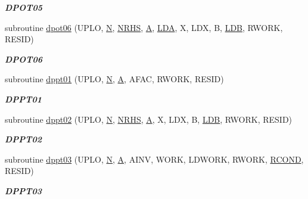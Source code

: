 \begin{DoxyCompactItemize}
\begin{DoxyCompactList}\small\item\em {\bfseries D\+P\+O\+T05} \end{DoxyCompactList}\item 
subroutine \hyperlink{group__double__lin_ga7ee02fd57fbaf3d01efd5c3c4bd04162}{dpot06} (U\+P\+L\+O, \hyperlink{polmisc_8c_a0240ac851181b84ac374872dc5434ee4}{N}, \hyperlink{example__user_8c_aa0138da002ce2a90360df2f521eb3198}{N\+R\+H\+S}, \hyperlink{classA}{A}, \hyperlink{example__user_8c_ae946da542ce0db94dced19b2ecefd1aa}{L\+D\+A}, X, L\+D\+X, B, \hyperlink{example__user_8c_a50e90a7104df172b5a89a06c47fcca04}{L\+D\+B}, R\+W\+O\+R\+K, R\+E\+S\+I\+D)
\begin{DoxyCompactList}\small\item\em {\bfseries D\+P\+O\+T06} \end{DoxyCompactList}\item 
subroutine \hyperlink{group__double__lin_ga5502a5326400044da75e1d0cd2739420}{dppt01} (U\+P\+L\+O, \hyperlink{polmisc_8c_a0240ac851181b84ac374872dc5434ee4}{N}, \hyperlink{classA}{A}, A\+F\+A\+C, R\+W\+O\+R\+K, R\+E\+S\+I\+D)
\begin{DoxyCompactList}\small\item\em {\bfseries D\+P\+P\+T01} \end{DoxyCompactList}\item 
subroutine \hyperlink{group__double__lin_ga34a38ca3e7e4c5fc00c39a32af0d576f}{dppt02} (U\+P\+L\+O, \hyperlink{polmisc_8c_a0240ac851181b84ac374872dc5434ee4}{N}, \hyperlink{example__user_8c_aa0138da002ce2a90360df2f521eb3198}{N\+R\+H\+S}, \hyperlink{classA}{A}, X, L\+D\+X, B, \hyperlink{example__user_8c_a50e90a7104df172b5a89a06c47fcca04}{L\+D\+B}, R\+W\+O\+R\+K, R\+E\+S\+I\+D)
\begin{DoxyCompactList}\small\item\em {\bfseries D\+P\+P\+T02} \end{DoxyCompactList}\item 
subroutine \hyperlink{group__double__lin_ga6739955c26eb26194b2a99dca1608d99}{dppt03} (U\+P\+L\+O, \hyperlink{polmisc_8c_a0240ac851181b84ac374872dc5434ee4}{N}, \hyperlink{classA}{A}, A\+I\+N\+V, W\+O\+R\+K, L\+D\+W\+O\+R\+K, R\+W\+O\+R\+K, \hyperlink{superlu__enum__consts_8h_af00a42ecad444bbda75cde1b64bd7e72a9b5c151728d8512307565994c89919d5}{R\+C\+O\+N\+D}, R\+E\+S\+I\+D)
\begin{DoxyCompactList}\small\item\em {\bfseries D\+P\+P\+T03} \end{DoxyCompactList}\item 

\end{DoxyCompactItemize}
